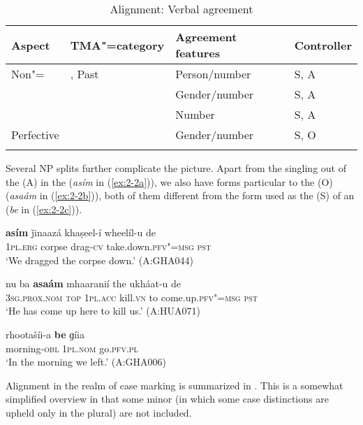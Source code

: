 \begin{table}[t]
\caption{Alignment: Verbal agreement}
\begin{tabularx}{\textwidth}{ l l Q Q }
\lsptoprule
Aspect &
TMA"=category &
Agreement features &
Controller \\\midrule
Non"= &
, Past  &
Person/number &
S, A \\
&
 &
Gender/number &
S, A \\
&
 &
Number &
S, A \\
Perfective &
&
Gender/number &
S, O \\\lspbottomrule
\end{tabularx}
\label{tab:2-verbagr}
\end{table}

\largerpage[-1]
Several NP splits further complicate the picture. Apart from the singling out of the   (A) in the  (\textit{asím} in (\ref{ex:2-2a})), we also have  forms particular to the  (O) (\textit{asaám} in (\ref{ex:2-2b})), both of them different from the form used as the  (S) of an   (\textit{be} in (\ref{ex:2-2c})).

\begin{exe}
\ex
\label{ex:2-2a}
\gll \textbf{asím} ǰinaazá khaṣeel-í wheelíl-u de \\
\textsc{1pl.erg} corpse drag-\textsc{cv} take.down.\textsc{pfv"=msg} \textsc{pst}  \\
\glt `We dragged the corpse down.' (A:GHA044)

\ex
\label{ex:2-2b}
\gll nu ba \textbf{asaám} mhaaranií the ukháat-u de \\
\textsc{3sg.prox.nom} \textsc{top} \textsc{1pl.acc} kill.\textsc{vn} to come.up.\textsc{pfv"=msg} \textsc{pst}  \\
\glt `He has come up here to kill us.' (A:HUA071)

\ex
\label{ex:2-2c}
\gll rhootašíi-a \textbf{be} ɡíia  \\
morning-\textsc{obl} \textsc{1pl.nom} go.\textsc{pfv.pl}  \\
\glt `In the morning we left.' (A:GHA006)
\end{exe}


Alignment in the realm of case marking is summarized in . This is a somewhat simplified overview in that some minor  (in which some case distinctions are upheld only in the plural) are not included.


